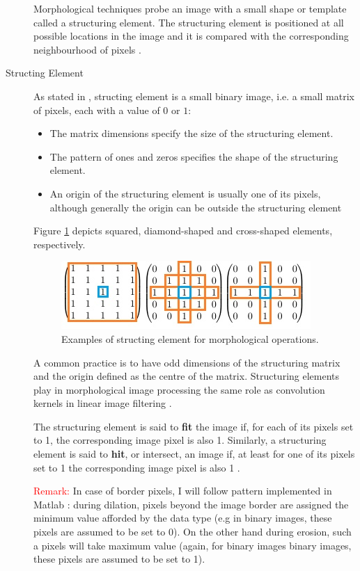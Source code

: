 \documentclass{article}
\begin{document}
\begin{description}
Morphological techniques probe an image with a small shape or template called a structuring element. The structuring element is positioned at all possible locations in the image and it is compared with the corresponding neighbourhood of pixels \cite{morphological}.

%
%
\item[Structing Element] As stated in \cite{morphological}, structing element is a small binary image, i.e. a small matrix of pixels, each with a value of $0$ or $1$:

\begin{itemize}
\item The matrix dimensions specify the size of the structuring element.
\item The pattern of ones and zeros specifies the shape of the structuring element.
\item An origin of the structuring element is usually one of its pixels, although generally the origin can be outside the structuring element
\end{itemize}

Figure \ref{fig:struct_exampl} depicts squared, diamond-shaped and cross-shaped elements, respectively.
\begin{figure}[H]
  \centering
  \includegraphics[width=0.7\linewidth]{_Figures/struct_el_example.jpg}
  \caption{Examples of structing element for morphological operations.}
  \label{fig:struct_exampl}
\end{figure}%


A common practice is to have odd dimensions of the structuring matrix and the origin defined as the centre of the matrix. Structuring elements play in morphological image processing the same role as convolution kernels in linear image filtering \cite{morphological}.

The structuring element is said to \textbf{fit} the image if, for each of its pixels set to 1, the corresponding image pixel is also 1. Similarly, a structuring element is said to \textbf{hit}, or intersect, an image if, at least for one of its pixels set to 1 the corresponding image pixel is also 1 \cite{morphological}.

\textcolor{red}{Remark:} In case of border pixels, I will follow pattern implemented in Matlab \cite{matlab}: during dilation, pixels beyond the image border are assigned the minimum value afforded by the data type (e.g in binary images, these pixels are assumed to be set to 0). On the other hand during erosion, such a pixels will take maximum value (again, for binary images binary images, these pixels are assumed to be set to 1).


\end{description}
\end{document}
